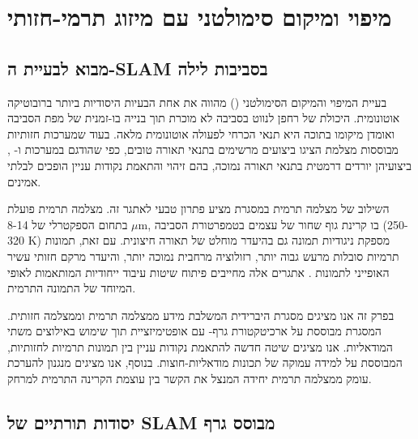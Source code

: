 
\section{מיפוי ומיקום סימולטני עם מיזוג תרמי-חזותי}
\label{sec:ch04_slam}

\subsection{מבוא לבעיית ה-SLAM בסביבות לילה}
\label{sec:ch04_intro}

בעיית המיפוי והמיקום הסימולטני () מהווה את אחת הבעיות היסודיות ביותר ברובוטיקה אוטונומית. היכולת של רחפן לנווט בסביבה לא מוכרת תוך בנייה בו-זמנית של מפת הסביבה ואומדן מיקומו בתוכה היא תנאי הכרחי לפעולה אוטונומית מלאה. בעוד שמערכות  חזותיות מבוססות מצלמת  הציגו ביצועים מרשימים בתנאי תאורה טובים, כפי שהודגם במערכות  \cite{Campos2021ORBSLAM3} ו- \cite{Qin2018VINSMono}, ביצועיהן יורדים דרמטית בתנאי תאורה נמוכה, בהם זיהוי והתאמת נקודות עניין הופכים לבלתי אמינים.

השילוב של מצלמה תרמית במסגרת  מציע פתרון טבעי לאתגר זה. מצלמה תרמית פועלת בתחום הספקטרלי של 8-14 $\mu$m, בו קרינת גוף שחור של עצמים בטמפרטורת הסביבה (250-320 K) מספקת ניגודיות תמונה גם בהיעדר מוחלט של תאורה חיצונית. עם זאת, תמונות תרמיות סובלות מרעש גבוה יותר, רזולוציה מרחבית נמוכה יותר, והיעדר מרקם חזותי עשיר האופייני לתמונות . אתגרים אלה מחייבים פיתוח שיטות עיבוד ייחודיות המותאמות לאופי המיוחד של התמונה התרמית.

בפרק זה אנו מציגים מסגרת  היברידית המשלבת מידע ממצלמה תרמית וממצלמה חזותית. המסגרת מבוססת על ארכיטקטורת גרף- עם אופטימיזציית  תוך שימוש באילוצים משתי המודאליות. אנו מציגים שיטה חדשה להתאמת נקודות עניין בין תמונות תרמיות לחזותיות, המבוססת על למידה עמוקה של תכונות מודאליות-חוצות. בנוסף, אנו מציגים מנגנון להערכת עומק ממצלמה תרמית יחידה המנצל את הקשר בין עוצמת הקרינה התרמית למרחק.

\subsection{יסודות תורתיים של SLAM מבוסס גרף}
\label{sec:ch04_graph_slam}


